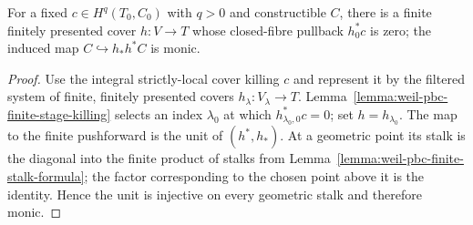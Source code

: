\begin{lemma}
\label{lemma:weil-pbc-finite-cover-killing}
\uses{}

For a fixed $c\in H^q(T_0,C_0)$ with $q>0$ and constructible $C$, there is a
finite finitely presented cover $h:V\to T$ whose closed-fibre pullback
$h_0^*c$ is zero; the induced map $C\hookrightarrow h_*h^*C$ is monic.
\end{lemma}
\begin{proof}

Use the integral strictly-local cover killing $c$ and represent it by the
filtered system of finite, finitely presented covers
$h_\lambda:V_\lambda\to T$.  Lemma~\ref{lemma:weil-pbc-finite-stage-killing}
selects an index $\lambda_0$ at which $h_{\lambda_0,0}^*c=0$; set
$h=h_{\lambda_0}$.  The map to the finite pushforward is the unit of
$(h^*,h_*)$.  At a geometric point its stalk is the diagonal into the finite
product of stalks from Lemma~\ref{lemma:weil-pbc-finite-stalk-formula}; the
factor corresponding to the chosen point above it is the identity.  Hence the
unit is injective on every geometric stalk and therefore monic.
\end{proof}

